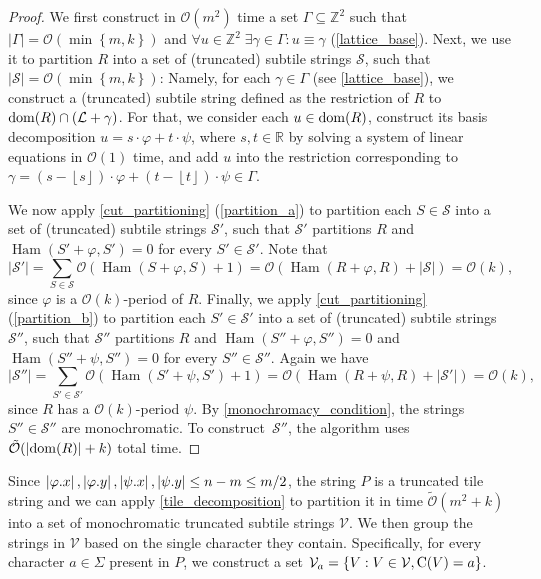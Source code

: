 \documentclass[a4paper,11pt]{article}
\let\Cref\cref
\newcommand{\R}{\mathbb{R}}
\newcommand{\Z}{\mathbb{Z}}
\renewcommand{\O}{\mathcal{O}}
\newcommand{\tO}{\tilde{\mathcal{O}}}
\renewcommand{\S}{\mathcal{S}}
\newcommand{\V}{\mathcal{V}}
\renewcommand{\L}{\mathcal{L}}
\renewcommand{\phi}{\varphi}
\newcommand{\floor}[1]{\left\lfloor #1 \right\rfloor}
\newcommand{\set}[1]{\left\lbrace #1 \right\rbrace}
\DeclareMathOperator*{\Ham}{Ham}
\newcommand{\absolute}[1]{\left\lvert#1\right\rvert}
\begin{document}
\restateThmTileDecomposition
\begin{proof}
We first construct in $\O(m^2)$ time a set $\Gamma \subseteq \Z^2$ such that $\absolute{\Gamma} = \O(\min\set{m, k})$ and $\forall u \in \Z^2 \; \exists \gamma \in \Gamma : u \equiv \gamma$ (\Cref{lattice_base}). Next, we use it to partition $R$ into a set of (truncated) subtile strings $\S$, such that $\absolute{\S} = \O(\min\set{m, k})$: Namely, for each $\gamma \in \Gamma$ (see \Cref{lattice_base}), we construct a (truncated) subtile string defined as the restriction of $R$ to $\d{R} \cap (\L + \gamma)$. For that, we consider each $u \in \operatorname*{dom}(R)$, construct its basis decomposition $u = s\cdot \phi + t\cdot \psi$, where $s,t\in \R$ by solving a system of linear equations in $\O(1)$ time, and add $u$ into the restriction corresponding to $\gamma = (s-\floor{s}) \cdot \phi + (t-\floor{t}) \cdot \psi \in \Gamma$. 

	We now apply \Cref{cut_partitioning} (\ref{partition_a}) to partition each $S \in \S$  into a set of (truncated) subtile strings $\S'$, such that $\S'$ partitions $R$ and $\Ham(S' + \phi, S') = 0$ for every $S' \in \S'$.
	Note that
	\[ \absolute{\S'} = \sum_{S \in \S} \O(\Ham(S + \phi, S) + 1) = \O(\Ham(R + \phi, R) + \absolute{\S}) = \O(k),\]
	since $\phi$ is a $\O(k)$-period of $R$.
	Finally, we apply  \Cref{cut_partitioning} (\ref{partition_b}) to partition each $S' \in \S'$ into a set of (truncated) subtile strings $\S''$, such that $\S''$ partitions $R$ and $\Ham(S'' + \phi, S'') = 0$ and $\Ham(S'' + \psi, S'') = 0$ for every $S'' \in \S''$.
	Again we have
	\[ \absolute{\S''} = \sum_{S' \in \S'} \O(\Ham(S' + \psi, S') + 1) = \O(\Ham(R + \psi, R) + \absolute{\S'}) = \O(k),\]
	since $R$ has a $\O(k)$-period $\psi$.
	By \Cref{monochromacy_condition}, the strings $S'' \in \S''$ are monochromatic.
	To construct~$\S''$, the algorithm uses $\tO(\absolute{\d{R}} + k)$ total time.
\end{proof}


Since $\absolute{\x{\phi}}, \absolute{\y{\phi}}, \absolute{\x{\psi}}, \absolute{\y{\psi}} \le n - m \le m / 2$, the string $P$ is a truncated tile string and we can apply \Cref{tile_decomposition} to partition it in time $\tO(m^2 + k)$ into a set of monochromatic truncated subtile strings $\V$. We then group the strings in $\V$ based on the single character they contain. Specifically, for every character $a \in \Sigma$ present in $P$, we construct a set $\V_a = \set{V : V \in \V, \getchar{V} = a}$.
\end{document}
